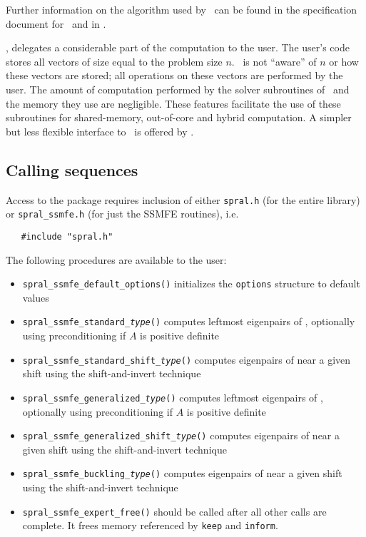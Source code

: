 Further information on the algorithm used by
\fullpackagename\ can be found in the
specification document for \engine\
and in \report.

\fullpackagename,
delegates 
a considerable part of the computation to the user.
The user's code stores all  vectors  of size equal to the problem size $n$.
\fullpackagename\
is not ``aware'' of $n$ or how these vectors are stored; 
all operations on these vectors are performed by the user.
The amount of computation performed by 
the solver subroutines of \fullpackagename\
and the memory they use are negligible. 
These features facilitate the use of these subroutines
for shared-memory, out-of-core and hybrid computation.
A simpler but less flexible interface to
\fullpackagename\
is offered by \simple.

\subsection{Calling sequences}

\label{sec:call}

Access to the package requires inclusion of either \texttt{spral.h} (for the
entire \spral library) or \texttt{spral\_ssmfe.h} (for just the SSMFE routines), i.e.

\begin{verbatim}
   #include "spral.h"
\end{verbatim}

\noindent The following procedures are available to the user:
%
\begin{itemize}
\vspace{-0.1cm}
\item {\tt spral\_ssmfe\_default\_options()} initializes the \texttt{options} structure to default values
\item {\tt spral\_ssmfe\_standard\_\textit{type}()} 
computes leftmost eigenpairs of , 
optionally using preconditioning if $A$ is positive definite
\item {\tt spral\_ssmfe\_standard\_shift\_\textit{type}()} 
computes eigenpairs of \Ref{evp} near a given shift
using the shift-and-invert technique
\item {\tt spral\_ssmfe\_generalized\_\textit{type}()} 
computes leftmost eigenpairs of 
, optionally using preconditioning if $A$ is positive definite
\item {\tt spral\_ssmfe\_generalized\_shift\_\textit{type}()} 
computes eigenpairs of 
\Ref{evp.g} near a given shift
using the shift-and-invert technique
\item {\tt spral\_ssmfe\_buckling\_\textit{type}()} 
computes eigenpairs of 
\Ref{evp.b} near a given shift
using the shift-and-invert technique
\item {\tt spral\_ssmfe\_expert\_free()} should be called after all other calls
are complete. It frees memory referenced by \texttt{keep} and \texttt{inform}.
%
\end{itemize}

